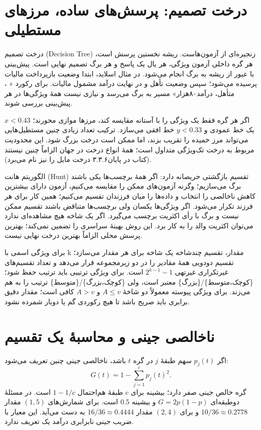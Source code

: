 \documentclass[12pt,a4paper,oneside]{report}
\begin{document}
\section{درخت تصمیم: پرسش‌های ساده، مرزهای مستطیلی}

درخت تصمیم (Decision Tree) زنجیره‌ای از آزمون‌هاست. ریشه نخستین پرسش است، هر گره داخلی آزمون ویژگی، هر یال یک پاسخ و هر برگ تصمیم نهایی است. پیش‌بینی با عبور از ریشه به برگ انجام می‌شود. در مثال اسلاید، ابتدا وضعیت بازپرداخت مالیات پرسیده می‌شود؛ سپس وضعیت تأهل و در نهایت درآمد مشمول مالیات. برای رکورد « ، متأهل، درآمد۸۰هزار» مسیر به برگ  می‌رسد و نیازی نیست همهٔ ویژگی‌ها در هر پیش‌بینی بررسی شوند.

اگر هر گره فقط یک ویژگی را با آستانه مقایسه کند، مرزها موازی محورند؛ $x<0.43$ یک خط عمودی و $y<0.33$ خط افقی می‌سازد. ترکیب تعداد زیادی چنین مستطیل‌هایی می‌تواند مرز خمیده را تقریب بزند، اما ممکن است درخت بزرگ شود. این محدودیت مربوط به درخت تک‌ویژگی متداول است؛ همهٔ انواع درخت در جهان الزاماً چنین نیستند (کتاب در پایان۳.۳.۶ درخت مایل را نیز نام می‌برد).

الگوریتم هانت (Hunt) تقسیم بازگشتی حریصانه دارد: اگر همهٔ برچسب‌ها یکی باشند برگ می‌سازیم؛ وگرنه آزمون‌های ممکن را مقایسه می‌کنیم، آزمون دارای بیشترین کاهش ناخالصی را انتخاب و داده‌ها را میان فرزندان تقسیم می‌کنیم؛ همین کار برای هر فرزند تکرار می‌شود. اگر ویژگی‌ها یکسان ولی برچسب‌ها متناقض باشند تقسیم ممکن نیست و برگ با رأی اکثریت برچسب می‌گیرد. اگر یک شاخه هیچ مشاهده‌ای ندارد می‌توان اکثریت والد را به کار برد. این روش بهینهٔ سراسری را تضمین نمی‌کند؛ بهترین پرسش محلی الزاماً بهترین درخت نهایی نیست.

برای ویژگی اسمی با k مقدار، تقسیم چندشاخه یک شاخه برای هر مقدار می‌سازد؛ تقسیم دودویی همهٔ مقادیر را در دو زیرمجموعه قرار می‌دهد و تعداد تقسیم‌های غیرتکراری غیرتهی $2^{k-1}-1$ است. برای ویژگی ترتیبی باید ترتیب حفظ شود؛ \{کوچک،متوسط\}/\{بزرگ\} معتبر است، ولی \{کوچک،بزرگ\}/\{متوسط\} ترتیب را به هم می‌زند. برای ویژگی پیوسته معمولاً دو شاخهٔ $A\le v$ و $A>v$ کافی است؛ مقدار دقیق برابری باید صریح باشد تا هیچ رکوردی گم یا دوبار شمرده نشود.

\section{ناخالصی جینی و محاسبهٔ یک تقسیم}

اگر $p_j(t)$ سهم طبقهٔ $j$ در گره $t$ باشد، ناخالصی جینی چنین تعریف می‌شود:
\[G(t)=1-\sum_{j=1}^c p_j(t)^2.\]
گره خالص جینی صفر دارد؛ بیشینه برای $c$ طبقهٔ هم‌احتمال $1-1/c$ است. در مسئلهٔ دوطبقه‌ای $G=2p(1-p)$ و بیشینه $0.5$ است. برای شمارش‌های $(1,5)$ مقدار $10/36\approx0.2778$ و برای $(2,4)$ مقدار $16/36\approx0.4444$ به دست می‌آید. این معیار با ضریب جینی نابرابری درآمد یک تعریف ندارد.
\end{document}
